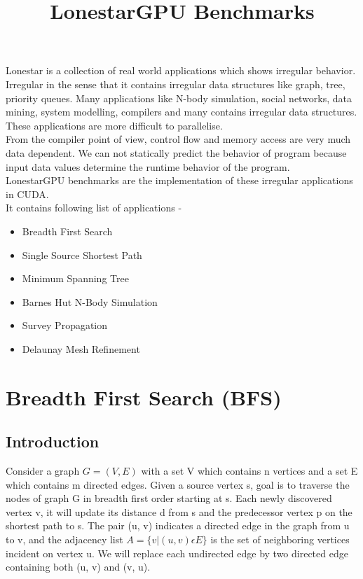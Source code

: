 \documentclass{article}
\begin{document}
\title{LonestarGPU Benchmarks}
\date{}
\maketitle


Lonestar is a collection of real world applications which shows irregular behavior. Irregular in the sense that it contains irregular data structures like graph, tree, priority queues. Many applications like N-body simulation, social networks, data mining, system modelling, compilers and many contains irregular data structures. These applications are more difficult to parallelise. \\

From the compiler point of view, control flow and memory access are very much data dependent. We can not statically predict the behavior of program because input data values determine the runtime behavior of the program.\\

LonestarGPU benchmarks are the implementation of these irregular applications in CUDA. \\

It contains following list of applications -

\begin{itemize}
\item Breadth First Search 
\item Single Source Shortest Path 
\item Minimum Spanning Tree 
\item Barnes Hut N-Body Simulation 
\item Survey Propagation 
\item Delaunay Mesh Refinement 
\end{itemize}




\section{Breadth First Search (BFS)}
\subsection{Introduction} 

Consider a graph $G = (V, E)$ with a set V which contains n vertices and a set E which contains m directed edges. Given a source vertex s, goal is to traverse the nodes of graph G in breadth first order starting at s. Each newly discovered vertex v, it will update its distance d from s and the predecessor vertex p on the shortest path to s. The pair (u, v) indicates a directed edge in the graph from u to v, and the adjacency list $A = \{ v | (u, v) \epsilon E \}$ is the set of neighboring vertices incident on vertex u. We will replace each undirected edge by two directed edge containing both (u, v) and (v, u). \\
\end{document}
